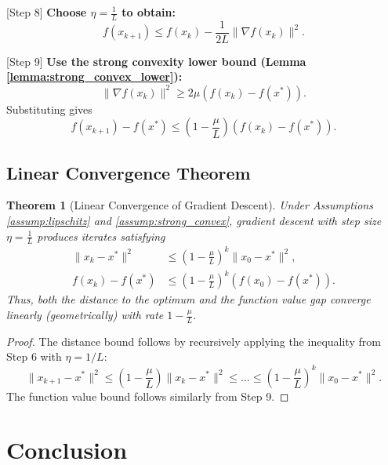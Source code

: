 \documentclass{article}
\newtheorem{theorem}{Theorem}
\begin{document}
[Step 8] \textbf{Choose $\eta = \frac{1}{L}$ to obtain:}
\begin{equation}
    f(x_{k+1}) \le f(x_k) - \frac{1}{2L} \|\nabla f(x_k)\|^2.
\end{equation}

[Step 9] \textbf{Use the strong convexity lower bound (Lemma \ref{lemma:strong_convex_lower}):}
\begin{equation}
    \|\nabla f(x_k)\|^2 \ge 2\mu (f(x_k) - f(x^*)).
\end{equation}
Substituting gives
\begin{equation}
    f(x_{k+1}) - f(x^*) \le \left(1 - \frac{\mu}{L}\right) (f(x_k) - f(x^*)).
\end{equation}

\subsection{Linear Convergence Theorem}

\begin{theorem}[Linear Convergence of Gradient Descent] \label{thm:linear_convergence}
    Under Assumptions \ref{assump:lipschitz} and \ref{assump:strong_convex}, gradient descent with step size $\eta = \frac{1}{L}$ produces iterates satisfying
    \begin{align}
        \|x_k - x^*\|^2 &\le \left(1 - \frac{\mu}{L}\right)^k \|x_0 - x^*\|^2, \\
        f(x_k) - f(x^*) &\le \left(1 - \frac{\mu}{L}\right)^k (f(x_0) - f(x^*)).
    \end{align}
    Thus, both the distance to the optimum and the function value gap converge linearly (geometrically) with rate $1 - \frac{\mu}{L}$.
\end{theorem}

\begin{proof}
    The distance bound follows by recursively applying the inequality from Step 6 with $\eta = 1/L$:
    \begin{equation}
        \|x_{k+1} - x^*\|^2 \le \left(1 - \frac{\mu}{L}\right) \|x_k - x^*\|^2 \le \dots \le \left(1 - \frac{\mu}{L}\right)^k \|x_0 - x^*\|^2.
    \end{equation}
    The function value bound follows similarly from Step 9.
\end{proof}

\section{Conclusion}
\end{document}
